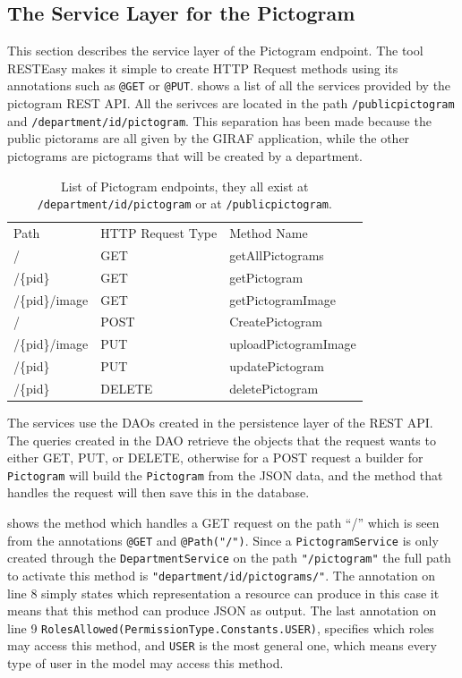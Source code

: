 \subsection{The Service Layer for the Pictogram}
This section describes the service layer of the Pictogram endpoint.
The tool RESTEasy makes it simple to create HTTP Request methods using its annotations such as \texttt{@GET} or \texttt{@PUT}.
 shows a list of all the services provided by the pictogram REST API.
All the serivces are located in the path \texttt{/publicpictogram} and \texttt{/department/{id}/pictogram}.
This separation has been made because the public pictorams are all given by the GIRAF application, while the other pictograms are pictograms that will be created by a department.

\begin{table}[]
\centering
\caption{List of Pictogram endpoints, they all exist at \texttt{/department/id/pictogram} or at \texttt{/publicpictogram}.}
\label{tbl:pictogramservice}
\begin{tabular}{lll}
Path           & HTTP Request Type & Method Name          \\
/              & GET               & getAllPictograms     \\
/\{pid\}       & GET               & getPictogram         \\
/\{pid\}/image & GET               & getPictogramImage    \\
/              & POST              & CreatePictogram      \\
/\{pid\}/image & PUT               & uploadPictogramImage \\
/\{pid\}       & PUT               & updatePictogram      \\
/\{pid\}	   & DELETE			   & deletePictogram	  \\
\end{tabular}
\end{table}

The services use the DAOs created in the persistence layer of the REST API. 
The queries created in the DAO retrieve the objects that the request wants to either GET, PUT, or DELETE, otherwise for a POST request a builder for \texttt{Pictogram} will build the \texttt{Pictogram} from the JSON data, and the method that handles the request will then save this in the database.

 shows the method which handles a GET request on the path ``/'' which is seen from the annotations \texttt{@GET} and \texttt{@Path("/")}.
Since a \texttt{PictogramService} is only created through the \texttt{DepartmentService} on the path \texttt{"/pictogram"} the full path to activate this method is \texttt{"department/{id}/pictograms/"}.
The annotation on line 8 simply states which representation a resource can produce in this case it means that this method can produce JSON as output.
The last annotation on line 9 \texttt{RolesAllowed({PermissionType.Constants.USER})}, specifies which roles may access this method, and \texttt{USER} is the most general one, which means every type of user in the model may access this method.

